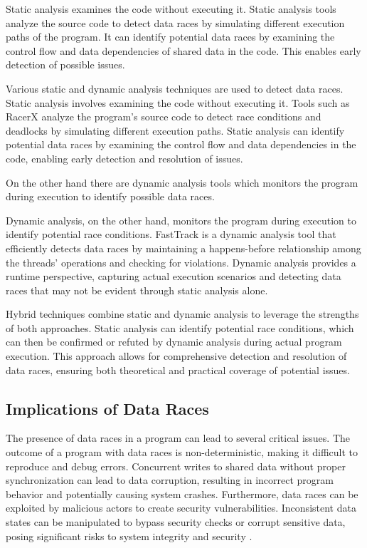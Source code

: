 \documentclass[
fancyheadings, %
%
%
]{stsreprt}
\begin{document}
{		Static analysis examines the code without executing it. Static analysis tools analyze the source code to detect data races by simulating different execution paths of the program. It can identify potential data races by examining the control flow  and data dependencies of shared data in the code. This enables early detection of possible issues.
		
		Various static and dynamic analysis techniques are used to detect data races. Static analysis involves examining the code without executing it. Tools such as RacerX \cite{engler2003} analyze the program's source code to detect race conditions and deadlocks by simulating different execution paths. Static analysis can identify potential data races by examining the control flow and data dependencies in the code, enabling early detection and resolution of issues.
		
		On the other hand there are dynamic analysis tools which monitors the program during execution to identify possible data races.
		
		Dynamic analysis, on the other hand, monitors the program during execution to identify potential race conditions. FastTrack \cite{flanagan2009} is a dynamic analysis tool that efficiently detects data races by maintaining a happens-before relationship among the threads' operations and checking for violations. Dynamic analysis provides a runtime perspective, capturing actual execution scenarios and detecting data races that may not be evident through static analysis alone.
		
		Hybrid techniques combine static and dynamic analysis to leverage the strengths of both approaches. Static analysis can identify potential race conditions, which can then be confirmed or refuted by dynamic analysis during actual program execution. This approach allows for comprehensive detection and resolution of data races, ensuring both theoretical and practical coverage of potential issues.
		
		\subsection{Implications of Data Races}
		
		The presence of data races in a program can lead to several critical issues. The outcome of a program with data races is non-deterministic, making it difficult to reproduce and debug errors. Concurrent writes to shared data without proper synchronization can lead to data corruption, resulting in incorrect program behavior and potentially causing system crashes. Furthermore, data races can be exploited by malicious actors to create security vulnerabilities. Inconsistent data states can be manipulated to bypass security checks or corrupt sensitive data, posing significant risks to system integrity and security \cite{adve1996}.
		
}
\end{document}

